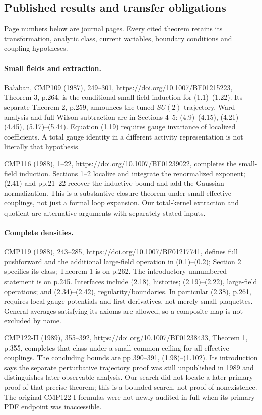 \subsection{Published results and transfer obligations}
\label{hrb-published}

Page numbers below are journal pages. Every cited theorem
retains its transformation, analytic class, current
variables, boundary conditions and coupling hypotheses.

\paragraph{Small fields and extraction.}
Ba{\l}aban, CMP109 (1987), 249--301,
\url{https://doi.org/10.1007/BF01215223},
Theorem 3, p.264, is the conditional small-field induction
for (1.1)--(1.22). Its separate Theorem 2, p.259,
announces the tuned \(SU(2)\) trajectory. Ward analysis
and full Wilson subtraction are in Sections 4--5:
(4.9)--(4.15), (4.21)--(4.45), (5.17)--(5.44).
Equation (1.19) requires gauge invariance of localized
coefficients. A total gauge identity in a different
activity representation is not literally that hypothesis.

CMP116 (1988), 1--22,
\url{https://doi.org/10.1007/BF01239022},
completes the small-field induction. Sections 1--2
localize and integrate the renormalized exponent;
(2.41) and pp.21--22 recover the inductive bound
and add the Gaussian normalization. This is a
substantive closure theorem under small effective
couplings, not just a formal loop expansion.
Our total-kernel extraction and quotient are
alternative arguments with separately stated inputs.

\paragraph{Complete densities.}
CMP119 (1988), 243--285,
\url{https://doi.org/10.1007/BF01217741},
defines full pushforward and the additional large-field
operation in (0.1)--(0.2); Section 2 specifies its
class; Theorem 1 is on p.262. The introductory
unnumbered statement is on p.245. Interfaces include
(2.18), histories; (2.19)--(2.22), large-field
operations; and (2.34)--(2.42), regularity/boundaries.
In particular (2.38), p.261, requires local gauge
potentials and first derivatives, not merely small
plaquettes. General averages satisfying its axioms
are allowed, so a composite map is not excluded by name.

CMP122-II (1989), 355--392,
\url{https://doi.org/10.1007/BF01238433},
Theorem 1, p.355, completes that class under a small
common ceiling for all effective couplings.
The concluding bounds are pp.390--391, (1.98)--(1.102).
Its introduction says the separate perturbative
trajectory proof was still unpublished in 1989 and
distinguishes later observable analysis.
Our search did not locate a later primary proof
of that precise theorem; this is a bounded search,
not proof of nonexistence. The original CMP122-I
formulas were not newly audited in full when its
primary PDF endpoint was inaccessible.

